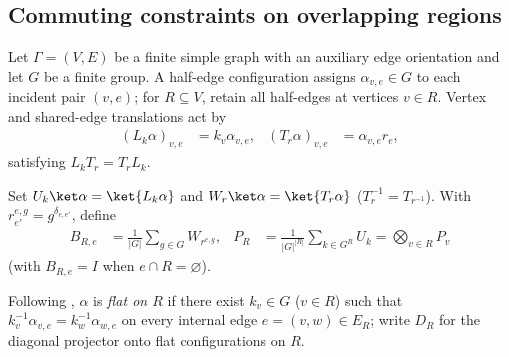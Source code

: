 \subsection{Commuting constraints on overlapping regions}

Let $\Gamma=(V,E)$ be a finite simple graph with an auxiliary edge orientation and let $G$ be a finite group. A half-edge configuration assigns $\alpha_{v,e}\in G$ to each incident pair $(v,e)$; for $R\subseteq V$, retain all half-edges at vertices $v\in R$. Vertex and shared-edge translations act by
\begin{align}
    (L_k\alpha)_{v,e} & =k_v\alpha_{v,e}, &
    (T_r\alpha)_{v,e} & =\alpha_{v,e}r_e,
    \label{eq:peps_regional_left_right_actions}
\end{align}
satisfying $L_kT_r=T_rL_k$.

\begin{definition}%
    \label{def:peps_regional_translation_averages}
    \leanok
    Set $U_k\ket\alpha=\ket{L_k\alpha}$ and $W_r\ket\alpha=\ket{T_r\alpha}$ ($T_r^{-1}=T_{r^{-1}}$). With $r^{e,g}_{e'}=g^{\delta_{e,e'}}$, define
    \begin{align}
        B_{R,e} & =\frac{1}{|G|}\sum_{g\in G}W_{r^{e,g}},                       &
        P_R     & =\frac{1}{|G|^{|R|}}\sum_{k\in G^R}U_k=\bigotimes_{v\in R}P_v
        \label{eq:peps_regional_translation_averages}
    \end{align}
    (with $B_{R,e}=I$ when $e\cap R=\varnothing$).
\end{definition}

\begin{definition}%
    \label{def:peps_regional_half_edge_flat}
    \leanok
    Following \cite[Section~6]{Schuch2010PEPS}, $\alpha$ is \emph{flat on $R$} if there exist $k_v\in G$ ($v\in R$) such that $k_v^{-1}\alpha_{v,e}=k_w^{-1}\alpha_{w,e}$ on every internal edge $e=(v,w)\in E_R$; write $D_R$ for the diagonal projector onto flat configurations on $R$.
\end{definition}

